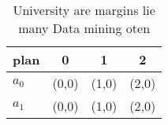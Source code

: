\documentclass[a4paper]{article}
\begin{document}
\begin{table}
\begin{adjustbox}{width=0.5\columnwidth}
\begin{tabular}{|l|l|l|l|}
\hline
\textbf{plan} & \multicolumn{1}{c|}{\textbf{0}} & \multicolumn{1}{c|}{\textbf{1}} & \multicolumn{1}{c|}{\textbf{2}} \\ \hline
\textbf{$a_0$}  & (0,0) & (1,0) & (2,0) \\ \hline
\textbf{$a_1$}  & (0,0) & (1,0) & (2,0) \\ \hline
\end{tabular}
\end{adjustbox}
\caption{University are margins lie many Data mining oten 
}
\end{table}
\end{document}
